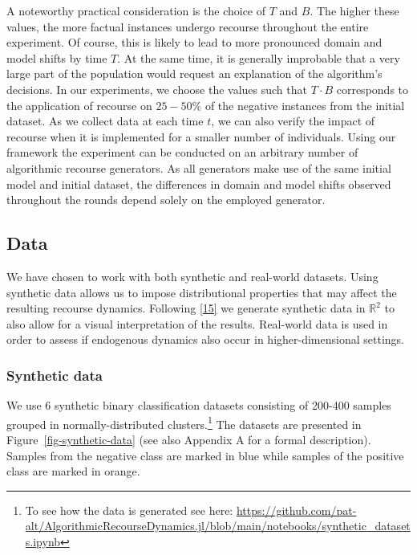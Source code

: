 \documentclass[
  conference]{IEEEtran}
\begin{document}
A noteworthy practical consideration is the choice of \(T\) and \(B\).
The higher these values, the more factual instances undergo recourse
throughout the entire experiment. Of course, this is likely to lead to
more pronounced domain and model shifts by time \(T\). At the same time,
it is generally improbable that a very large part of the population
would request an explanation of the algorithm's decisions. In our
experiments, we choose the values such that \(T \cdot B\) corresponds to
the application of recourse on \(25-50\%\) of the negative instances
from the initial dataset. As we collect data at each time \(t\), we can
also verify the impact of recourse when it is implemented for a smaller
number of individuals. Using our framework the experiment can be
conducted on an arbitrary number of algorithmic recourse generators. As
all generators make use of the same initial model and initial dataset,
the differences in domain and model shifts observed throughout the
rounds depend solely on the employed generator.

\hypertarget{sec-method-data}{%
\subsection{Data}\label{sec-method-data}}

We have chosen to work with both synthetic and real-world datasets.
Using synthetic data allows us to impose distributional properties that
may affect the resulting recourse dynamics. Following
\protect\hyperlink{ref-upadhyay2021towards}{{[}15{]}} we generate
synthetic data in \(\mathbb{R}^2\) to also allow for a visual
interpretation of the results. Real-world data is used in order to
assess if endogenous dynamics also occur in higher-dimensional settings.

\hypertarget{synthetic-data}{%
\subsubsection{Synthetic data}\label{synthetic-data}}

We use 6 synthetic binary classification datasets consisting of 200-400
samples grouped in normally-distributed clusters.\footnote{To see how
  the data is generated see here:
  \url{https://github.com/pat-alt/AlgorithmicRecourseDynamics.jl/blob/main/notebooks/synthetic_datasets.ipynb}}
The datasets are presented in Figure~\ref{fig-synthetic-data} (see also
Appendix A for a formal description). Samples from the negative class
are marked in blue while samples of the positive class are marked in
orange.
\end{document}
